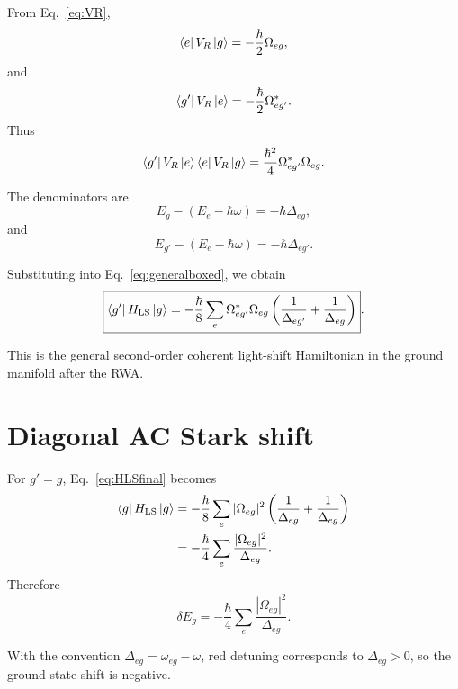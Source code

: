 \documentclass[11pt]{article}
\newcommand{\HLS}{H_{\mathrm{LS}}}
\newcommand{\VR}{V_R}
\begin{document}
From Eq.~\eqref{eq:VR},
\begin{equation}
\bra{e}\VR\ket{g}
=-\frac{\hbar}{2}\Omega_{eg},
\label{eq:Veg}
\end{equation}
and
\begin{equation}
\bra{g'}\VR\ket{e}
=-\frac{\hbar}{2}\Omega_{eg'}^*.
\label{eq:Vge}
\end{equation}
Thus
\begin{equation}
\bra{g'}\VR\ket{e}
\bra{e}\VR\ket{g}
=
\frac{\hbar^2}{4}
\Omega_{eg'}^*\Omega_{eg}.
\label{eq:Vproduct}
\end{equation}

The denominators are
\begin{equation}
E_g-(E_e-\hbar\omega)
=-\hbar\Delta_{eg},
\label{eq:deng}
\end{equation}
and
\begin{equation}
E_{g'}-(E_e-\hbar\omega)
=-\hbar\Delta_{eg'}.
\label{eq:dengp}
\end{equation}

Substituting into Eq.~\eqref{eq:generalboxed}, we obtain
\begin{equation}
\boxed{
\bra{g'}\HLS\ket{g}
=
-\frac{\hbar}{8}
\sum_e
\Omega_{eg'}^*\Omega_{eg}
\left(
\frac{1}{\Delta_{eg'}}
+
\frac{1}{\Delta_{eg}}
\right)
}.
\label{eq:HLSfinal}
\end{equation}

This is the general second-order coherent light-shift Hamiltonian in the ground manifold after the RWA.

\section{Diagonal AC Stark shift}

For $g'=g$, Eq.~\eqref{eq:HLSfinal} becomes
\begin{align}
\bra{g}\HLS\ket{g}
&=
-\frac{\hbar}{8}
\sum_e
|\Omega_{eg}|^2
\left(
\frac{1}{\Delta_{eg}}
+
\frac{1}{\Delta_{eg}}
\right)
\nonumber\\
&=
-\frac{\hbar}{4}
\sum_e
\frac{|\Omega_{eg}|^2}{\Delta_{eg}}.
\label{eq:diagonalshift}
\end{align}
Therefore
\begin{equation}
\boxed{
\delta E_g
=
-\frac{\hbar}{4}
\sum_e
\frac{|\Omega_{eg}|^2}{\Delta_{eg}}
}.
\label{eq:ACStark}
\end{equation}

With the convention $\Delta_{eg}=\omega_{eg}-\omega$, red detuning corresponds to $\Delta_{eg}>0$, so the ground-state shift is negative.
\end{document}
